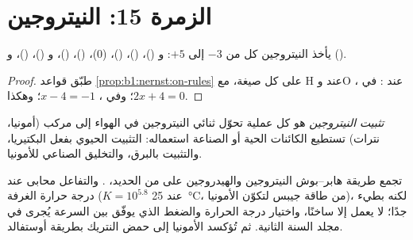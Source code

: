 \section{الزمرة 15: النيتروجين}

\begin{proposition}[سلّم النيتروجين]\label{prop:b1:p-block-13-15:nitrogen-ladder}
يأخذ النيتروجين كل  من $-3$ إلى $+5$: 
و ()،  ()،  ()،  (0)،
 ()،  ()،  و ()،
 ()،  و ().
\end{proposition}

\begin{proof}
طبّق قواعد \cref{prop:b1:nernst:on-rules} على كل صيغة، مع H
عند  وO عند : في ، $2x + 4 = 0$؛ وفي ، $x - 4 =
-1$؛ وهكذا.
\end{proof}

\begin{definition}\label{def:b1:p-block-13-15:nitrogen-fixation}
\emph{تثبيت النيتروجين} هو كل عملية
تحوّل ثنائي النيتروجين في الهواء إلى مركب (أمونيا، نترات)
تستطيع الكائنات الحية أو الصناعة استعماله: التثبيت الحيوي بفعل
البكتيريا، والتثبيت بالبرق، والتخليق الصناعي للأمونيا.
\end{definition}

تجمع طريقة هابر--بوش النيتروجين والهيدروجين على  من
الحديد، . والتفاعل محابى عند درجة حرارة
الغرفة ($K = 10^{5.8}$ عند \qty{25}{\celsius}، من طاقة جيبس
لتكوّن الأمونيا)، لكنه بطيء جدًا؛  لا يعمل إلا ساخنًا،
واختيار درجة الحرارة والضغط الذي يوفّق بين السرعة 
يُجرى في مجلد السنة الثانية. ثم تُؤكسد الأمونيا إلى حمض النتريك بطريقة
أوستفالد.

